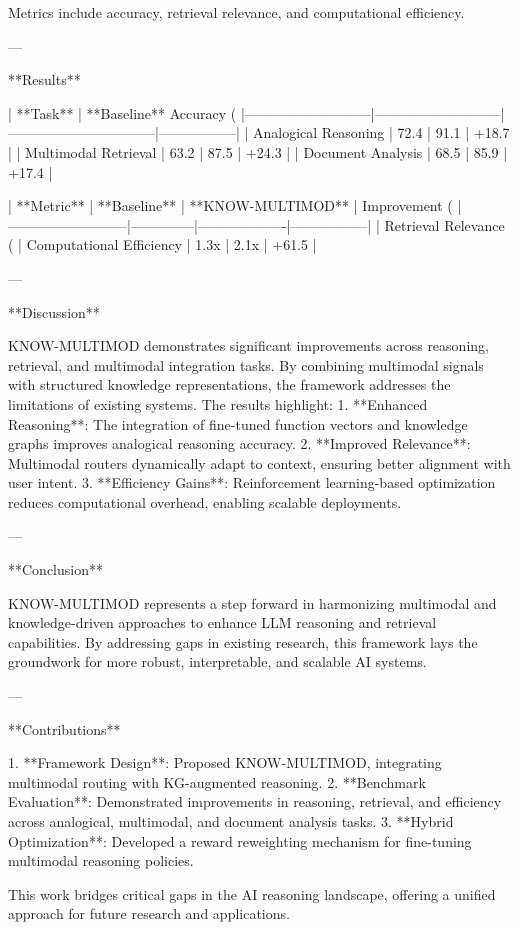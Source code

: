 Metrics include accuracy, retrieval relevance, and computational efficiency.

---

**Results**

| **Task**                  | **Baseline** Accuracy (%
|---------------------------|---------------------------|--------------------------------|-----------------|
| Analogical Reasoning      | 72.4                      | 91.1                           | +18.7           |
| Multimodal Retrieval      | 63.2                      | 87.5                           | +24.3           |
| Document Analysis         | 68.5                      | 85.9                           | +17.4           |

| **Metric**               | **Baseline** | **KNOW-MULTIMOD** | Improvement (%
|--------------------------|--------------|-------------------|-----------------|
| Retrieval Relevance (%
| Computational Efficiency | 1.3x         | 2.1x              | +61.5           |

---

**Discussion**

KNOW-MULTIMOD demonstrates significant improvements across reasoning, retrieval, and multimodal integration tasks. By combining multimodal signals with structured knowledge representations, the framework addresses the limitations of existing systems. The results highlight:
1. **Enhanced Reasoning**: The integration of fine-tuned function vectors and knowledge graphs improves analogical reasoning accuracy.
2. **Improved Relevance**: Multimodal routers dynamically adapt to context, ensuring better alignment with user intent.
3. **Efficiency Gains**: Reinforcement learning-based optimization reduces computational overhead, enabling scalable deployments.

---

**Conclusion**

KNOW-MULTIMOD represents a step forward in harmonizing multimodal and knowledge-driven approaches to enhance LLM reasoning and retrieval capabilities. By addressing gaps in existing research, this framework lays the groundwork for more robust, interpretable, and scalable AI systems.

---

**Contributions**

1. **Framework Design**: Proposed KNOW-MULTIMOD, integrating multimodal routing with KG-augmented reasoning.
2. **Benchmark Evaluation**: Demonstrated improvements in reasoning, retrieval, and efficiency across analogical, multimodal, and document analysis tasks.
3. **Hybrid Optimization**: Developed a reward reweighting mechanism for fine-tuning multimodal reasoning policies.

This work bridges critical gaps in the AI reasoning landscape, offering a unified approach for future research and applications.